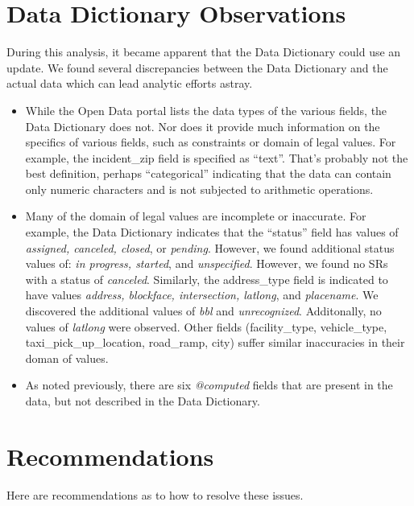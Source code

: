 \documentclass[12pt, titlepage]{article}
\begin{document}
\section{Data Dictionary Observations} 
\label{sec:datadictionary}
During this analysis, it became apparent that the  Data 
Dictionary could use an update. We found several discrepancies 
between the Data Dictionary and the actual data which can lead 
analytic efforts astray. 

\begin{itemize}
	\item While the Open Data portal lists the data types of the 
	various fields, the Data Dictionary does not. Nor does it provide 
	much information on the specifics of various fields, such 
	as constraints or domain of legal values. For example, the 
	incident\_zip field is specified as ``text''. That's probably not the 
	best definition, perhaps	``categorical'' indicating that the data can 
	contain only numeric characters and is not subjected to arithmetic 
	operations. 

	\item Many of the domain of legal values are incomplete or 
	inaccurate. For example, the Data Dictionary indicates that 
	the ``status'' field has values of \textit{assigned, canceled, closed}, 
	or \textit{pending}. However, we found additional status 
	values of: \textit{in progress, started}, and \textit{unspecified}. 
	However, we found no SRs with a status of \textit{canceled}. 
	Similarly, the address\_type field is indicated to have 
	values \textit{address, blockface, intersection, latlong}, and 
	\textit{placename}. We discovered the additional values of 
	\textit{bbl} and \textit{unrecognized}. Additonally, no values of 
	\textit{latlong} were observed. Other fields (facility\_type, 
	vehicle\_type, taxi\_pick\_up\_location, road\_ramp, city) 
	suffer similar inaccuracies in their doman of values.
	
	\item As noted previously, there are six \textit{@computed} fields that
	are present in the data, but not described in the Data Dictionary.
\end{itemize}



\section{Recommendations} 
\label{sec:recommendations}
Here are recommendations as to how to resolve these issues.
\end{document}

